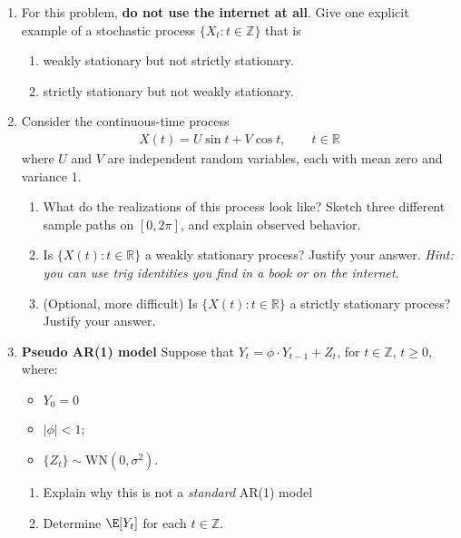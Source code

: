 \documentclass[10pt, letterpaper]{scrartcl}
\newcommand{\Z}{\mathbb{Z}}
\newcommand{\real}{\mathbb{R}}
\newcommand{\WN}{\text{WN}}
\begin{document}
\begin{enumerate}[align=left, leftmargin=*, label=\sffamily\bfseries Problem \arabic*:]    

\item For this problem, \textbf{do not use the internet at all}. 
Give one explicit example of a stochastic process $\{ X_t : t \in \Z\}$ that is 
\begin{enumerate}
\item weakly stationary but not strictly stationary.
\item strictly stationary but not weakly stationary.

\end{enumerate}
  

\item 
Consider the continuous-time process
\begin{align*}
  X(t) = U \sin t + V \cos t, \qquad t\in\real
\end{align*}
where $U$ and $V$ are independent random variables, each with mean zero 
and variance 1.
\begin{enumerate}
  \item
    What do the realizations of this process look like?  Sketch three different 
    sample paths on $[0,2\pi]$, and explain observed behavior.
  \item
    Is $\{X(t):t\in\real\}$ a weakly stationary process? Justify your answer. {\em Hint: you can use trig identities you find in a book or on the internet}.
\item
    (Optional, more difficult) Is $\{X(t):t\in\real\}$ a strictly 
    stationary process? Justify your answer.
\end{enumerate}



\item \textbf{\sffamily Pseudo AR(1) model}  Suppose that $Y_t=\phi\cdot Y_{t-1}+Z_t$, for $t\in\Z$, $t\ge0$, where:
\begin{itemize}
\item $Y_0=0$
\item $|\phi|<1$;
\item $\{Z_t\}\sim\WN(0,\sigma^2)$.
\end{itemize}
\begin{enumerate}
\item Explain why this is not a \emph{standard} AR(1) model

\item Determine $\E[Y_t]$ for each $t\in\mathbb{Z}$.



\end{enumerate}
\end{enumerate}
\end{document}
